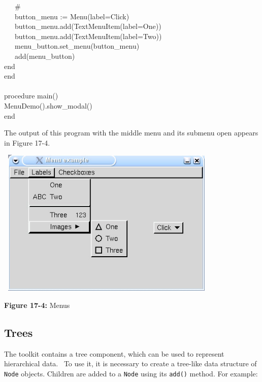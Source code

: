 {\>   \ \ \ \# \\
\>   \ \ \ button\_menu :=
Menu({\textquotedbl}label=Click{\textquotedbl}) \\
\>   \ \ \ button\_menu.add(TextMenuItem({\textquotedbl}label=One{\textquotedbl})) \\
\>   \ \ \ button\_menu.add(TextMenuItem({\textquotedbl}label=Two{\textquotedbl})) \\
\>   \ \ \ menu\_button.set\_menu(button\_menu) \\
\>   \ \ \ add(menu\_button) \\
\>   end \\
end \\
\ \\
procedure main() \\
\>   MenuDemo().show\_modal() \\
end
}

The output of this program with the middle menu and its submenu open
appears in Figure 17-4.\\

\begin{center}
\includegraphics[width=4.2043in,height=2.7925in]{ub-img/ub-img53.jpg}
\end{center}

{\sffamily\bfseries Figure 17-4:}
{\sffamily Menus}

\subsection{Trees}

The toolkit contains a tree component, which can be used to represent
hierarchical data. \ To use it, it is necessary to create a tree-like
data structure of \texttt{Node} objects. Children are added to a
\texttt{Node} using its \texttt{add()} method. For example:

